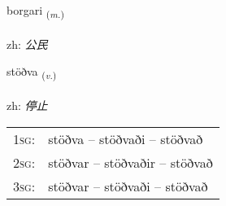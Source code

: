 \documentclass[frontgrid, backgrid]{flacards}\usepackage[]{graphicx}\usepackage[]{color}
\begin{document}
\renewcommand{\blhead}{\vskip5pt {\small\bfseries\footnotesize Nafnorð | 名词 }}
\renewcommand{\bcfoot}{\vskip5pt \hspace{2pt}{\small\bfseries\footnotesize 2K}}


{borgari \small{\textsubscript{(\textit{m.})}} \\[1ex] %
\textphonetic{[pɔrkarɪ]} \\
zh: \emph{公民} \\  [2ex]
\renewcommand*{\arraystretch}{0.8}
}

\renewcommand{\flhead}{\vskip5pt \fboxsep=0pt {\small\bfseries\footnotesize Sagnorð | 动词}}
\renewcommand{\fcfoot}{\vskip5pt \fboxsep=0pt \hspace{2pt}{\small\bfseries\footnotesize 2K}}

\renewcommand{\blhead}{\vskip5pt {\small\bfseries\footnotesize Sagnorð | 动词 }}
\renewcommand{\bcfoot}{\vskip5pt \hspace{2pt}{\small\bfseries\footnotesize 2K}}


{stöðva \small{\textsubscript{(\textit{v.})}} \\[1ex] %
\textphonetic{[stœðva]} \\
zh: \emph{停止} \\  [2ex]
\renewcommand*{\arraystretch}{0.8}
\begin{tabular}{p{1cm}l}
\textsc{1sg}: & stöðva -- stöðvaði -- stöðvað \\ 
\textsc{2sg}: & stöðvar -- stöðvaðir -- stöðvað \\ 
\textsc{3sg}: & stöðvar -- stöðvaði -- stöðvað \\ 
\end{tabular}
}
\end{document}
